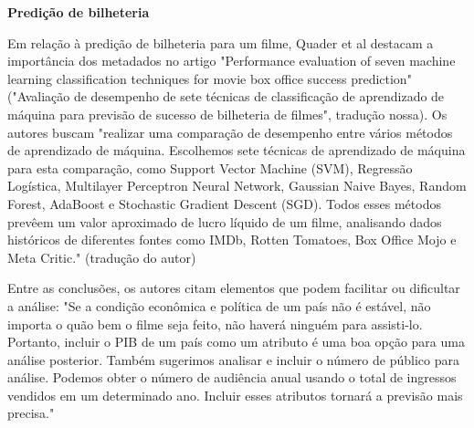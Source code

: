         \textbf{Predição de bilheteria}\par
        Em relação à predição de bilheteria para um filme, Quader et al destacam a importância dos metadados no artigo "Performance evaluation of seven machine learning classification techniques for movie box office success prediction" ("Avaliação de desempenho de sete técnicas de classificação de aprendizado de máquina para previsão de sucesso de bilheteria de filmes", tradução nossa). Os autores buscam "realizar uma comparação de desempenho entre vários métodos de aprendizado de máquina. Escolhemos sete técnicas de aprendizado de máquina para esta comparação, como Support Vector Machine (SVM), Regressão Logística, Multilayer Perceptron Neural Network, Gaussian Naive Bayes, Random Forest, AdaBoost e Stochastic Gradient Descent (SGD). Todos esses métodos prevêem um valor aproximado de lucro líquido de um filme, analisando dados históricos de diferentes fontes como IMDb, Rotten Tomatoes, Box Office Mojo e Meta Critic." \cite{quader2017} (tradução do autor)\par
        Entre as conclusões, os autores citam elementos que podem facilitar ou dificultar a análise: "Se a condição econômica e política de um país não é estável, não importa o quão bem o filme seja feito, não haverá ninguém para assisti-lo. Portanto, incluir o PIB de um país como um atributo é uma boa opção para uma análise posterior. Também sugerimos analisar e incluir o número de público para análise. Podemos obter o número de audiência anual usando o total de ingressos vendidos em um determinado ano. Incluir esses atributos tornará a previsão mais precisa."

